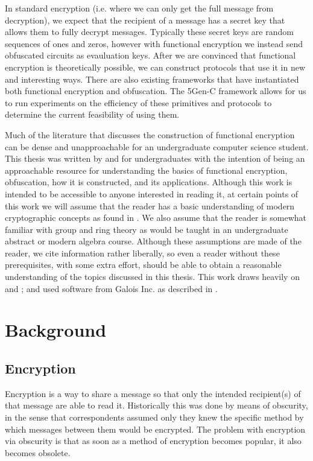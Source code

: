 \documentclass[12pt,twoside]{reedthesis}
\begin{document}
	\par In standard encryption (i.e. where we can only get the full message from decryption), we expect that the recipient of a message has a secret key that allows them to fully decrypt messages. Typically these secret keys are random sequences of ones and zeros, however with functional encryption we instead send obfuscated circuits as evauluation keys. After we are convinced that functional encryption is theoretically possible, we can construct protocols that use it in new and interesting ways. There are also existing frameworks that have instantiated both functional encryption and obfuscation. The 5Gen-C framework allows for us to run experiments on the efficiency of these primitives and protocols to determine the current feasibility of using them.
	\par Much of the literature that discusses the construction of functional encryption can be dense and unapproachable for an undergraduate computer science student. This thesis was written by and for undergraduates with the intention of being an approachable resource for understanding the basics of functional encryption, obfuscation, how it is constructed, and its applications. Although this work is intended to be accessible to anyone interested in reading it, at certain points of this work we will assume that the reader has a basic understanding of modern cryptographic concepts as found in \cite{Katz:2007:IMC:1206501}. We also assume that the reader is somewhat familiar with group and ring theory as would be taught in an undergraduate abstract or modern algebra course. Although these assumptions are made of the reader, we cite information rather liberally, so even a reader without these prerequisites, with some extra effort, should be able to obtain a reasonable understanding of the topics discussed in this thesis. This work draws heavily on \cite{Garg:2013} and \cite{GGH13}; and used software from Galois Inc. as described in \cite{5genc}.
    
   
    

    
    \chapter{Background}
    \section{Encryption}
    Encryption is a way to share a message so that only the intended recipient(s) of
    that message are able to read it. Historically this was done by means of obscurity, in the sense that correspondents assumed only they knew the specific method by which messages between them would be encrypted. The problem with encryption via obscurity is that as soon as a method of encryption becomes popular, it also becomes obsolete.
\end{document}
